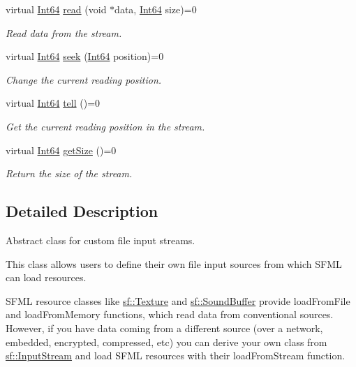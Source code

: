 \begin{DoxyCompactItemize}
virtual \hyperlink{namespacesf_a2840579fed3494d9f330baf7a5a19903}{Int64} \hyperlink{classsf_1_1_input_stream_a8dd89c74c1acb693203f50e750c6ae53}{read} (void $\ast$data, \hyperlink{namespacesf_a2840579fed3494d9f330baf7a5a19903}{Int64} size)=0
\begin{DoxyCompactList}\small\item\em Read data from the stream. \end{DoxyCompactList}\item 
virtual \hyperlink{namespacesf_a2840579fed3494d9f330baf7a5a19903}{Int64} \hyperlink{classsf_1_1_input_stream_a76aba8e5d5cf9b1c5902d5e04f7864fc}{seek} (\hyperlink{namespacesf_a2840579fed3494d9f330baf7a5a19903}{Int64} position)=0
\begin{DoxyCompactList}\small\item\em Change the current reading position. \end{DoxyCompactList}\item 
virtual \hyperlink{namespacesf_a2840579fed3494d9f330baf7a5a19903}{Int64} \hyperlink{classsf_1_1_input_stream_a599515b9ccdbddb6fef5a98424fd559c}{tell} ()=0
\begin{DoxyCompactList}\small\item\em Get the current reading position in the stream. \end{DoxyCompactList}\item 
virtual \hyperlink{namespacesf_a2840579fed3494d9f330baf7a5a19903}{Int64} \hyperlink{classsf_1_1_input_stream_a311eaaaa65d636728e5153b574b72d5d}{get\-Size} ()=0
\begin{DoxyCompactList}\small\item\em Return the size of the stream. \end{DoxyCompactList}\end{DoxyCompactItemize}


\subsection{Detailed Description}
Abstract class for custom file input streams. 

This class allows users to define their own file input sources from which S\-F\-M\-L can load resources.

S\-F\-M\-L resource classes like \hyperlink{classsf_1_1_texture}{sf\-::\-Texture} and \hyperlink{classsf_1_1_sound_buffer}{sf\-::\-Sound\-Buffer} provide load\-From\-File and load\-From\-Memory functions, which read data from conventional sources. However, if you have data coming from a different source (over a network, embedded, encrypted, compressed, etc) you can derive your own class from \hyperlink{classsf_1_1_input_stream}{sf\-::\-Input\-Stream} and load S\-F\-M\-L resources with their load\-From\-Stream function.

